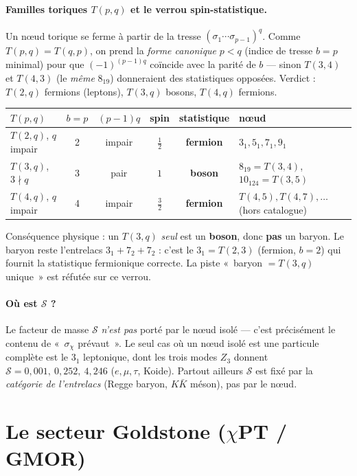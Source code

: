 \documentclass[11pt]{article}
\begin{document}
\paragraph{Familles toriques $T(p,q)$ et le verrou spin-statistique.}
Un nœud torique se ferme à partir de la tresse $(\sigma_1\cdots\sigma_{p-1})^q$. Comme $T(p,q)=T(q,p)$, on prend la \emph{forme canonique} $p<q$ (indice de tresse $b=p$ minimal) pour que $(-1)^{(p-1)q}$ coïncide avec la parité de $b$ --- sinon $T(3,4)$ et $T(4,3)$ (le \emph{même} $8_{19}$) donneraient des statistiques opposées. Verdict : $T(2,q)$ fermions (leptons), $T(3,q)$ bosons, $T(4,q)$ fermions.

\begin{center}
\begin{tabular}{@{}lccccl@{}}
\toprule
$T(p,q)$ & $b=p$ & $(p{-}1)q$ & spin & statistique & nœud \\
\midrule
$T(2,q)$, $q$ impair & 2 & impair & $\tfrac12$ & \textbf{fermion} & $3_1,5_1,7_1,9_1$ \\
$T(3,q)$, $3\nmid q$ & 3 & pair & $1$ & \textbf{boson} & $8_{19}{=}T(3,4)$, $10_{124}{=}T(3,5)$ \\
$T(4,q)$, $q$ impair & 4 & impair & $\tfrac32$ & \textbf{fermion} & $T(4,5),T(4,7),\dots$ (hors catalogue) \\
\bottomrule
\end{tabular}
\end{center}

\noindent Conséquence physique : un $T(3,q)$ \emph{seul} est un \textbf{boson}, donc \textbf{pas} un baryon. Le baryon reste l'entrelacs $3_1+7_2+7_2$ : c'est le $3_1=T(2,3)$ (fermion, $b=2$) qui fournit la statistique fermionique correcte. La piste «~baryon $=T(3,q)$ unique~» est réfutée sur ce verrou.

\paragraph{Où est $\mathcal{S}$ ?}
Le facteur de masse $\mathcal{S}$ \emph{n'est pas} porté par le nœud isolé --- c'est précisément le contenu de «~$\sigma_\chi$ prévaut~». Le seul cas où un nœud isolé est une particule complète est le $3_1$ leptonique, dont les trois modes $Z_3$ donnent $\mathcal{S}=0{,}001,\ 0{,}252,\ 4{,}246$ ($e,\mu,\tau$, Koide). Partout ailleurs $\mathcal{S}$ est fixé par la \emph{catégorie de l'entrelacs} (Regge baryon, $K\bar K$ méson), pas par le nœud.

\section{Le secteur Goldstone ($\chi$PT / GMOR)}
\end{document}
